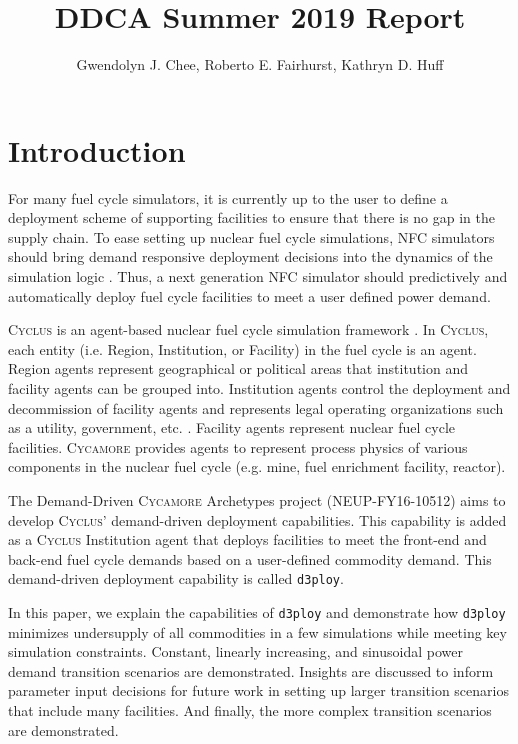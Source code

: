 \documentclass[11pt,letterpaper]{article}
\title{DDCA Summer 2019 Report}
\author{Gwendolyn J. Chee, Roberto E. Fairhurst, Kathryn D. Huff}
\newcommand{\Cyclus}{\textsc{Cyclus}\xspace}%
\newcommand{\Cycamore}{\textsc{Cycamore}\xspace}%
\newcommand{\deploy}{\texttt{d3ploy}\xspace}%
\begin{document}
	\begin{titlepage}
	\maketitle
	\thispagestyle{empty}
	\end{titlepage}

\section{Introduction}
For many fuel cycle simulators, it is currently up to the user 
to define a deployment scheme of supporting facilities to ensure 
that there is no gap in the supply chain. 
To ease setting up nuclear fuel cycle simulations, \gls{NFC}
simulators should bring demand responsive deployment decisions into 
the dynamics of the simulation logic \cite{huff_current_2017}. 
Thus, a next generation \gls{NFC} simulator should predictively and 
automatically deploy fuel cycle facilities to meet a user defined 
power demand. 

\Cyclus is an agent-based nuclear fuel cycle simulation framework 
\cite{huff_fundamental_2016}. 
In \Cyclus, each entity (i.e. Region, Institution, or Facility) in the 
fuel cycle is an agent. 
Region agents represent geographical or political areas that institution
and facility agents can be grouped into. 
Institution agents control the 
deployment and decommission of facility agents 
and represents legal operating organizations such as a 
utility, government, etc. \cite{huff_fundamental_2016}. 
Facility agents represent nuclear fuel cycle facilities. 
\Cycamore \cite{carlsen_cycamore_2014}
provides agents to represent process physics of various 
components in the nuclear fuel cycle (e.g. mine, fuel enrichment 
facility, reactor). 

The Demand-Driven \Cycamore Archetypes project (NEUP-FY16-10512) 
aims to develop \Cyclus' demand-driven deployment capabilities. 
This capability is added as a \Cyclus Institution
agent that deploys facilities to meet the front-end and back-end 
fuel cycle demands based on a user-defined commodity demand. 
This demand-driven deployment capability is called 
\deploy. 

In this paper, we explain the capabilities of \deploy and
demonstrate how \deploy minimizes undersupply of all 
commodities in a few simulations while meeting key simulation 
constraints. 
Constant, linearly increasing, and sinusoidal power demand
transition scenarios are demonstrated. 
Insights are discussed to inform parameter 
input decisions for future work in setting up 
larger transition scenarios that include many facilities.
And finally, the more complex transition scenarios are
demonstrated. 
\end{document}

